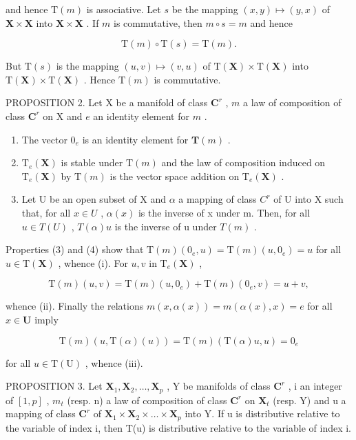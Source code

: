 and hence \(\mathrm{T}(m)\) is associative. Let \(s\) be the mapping \((x,y)\mapsto (y,x)\) of \(\mathbf{X}\times \mathbf{X}\) into \(\mathbf{X}\times \mathbf{X}\) . If \(m\) is commutative, then \(m\circ s = m\) and hence

\[
\mathrm{T} (m) \circ \mathrm{T} (s) = \mathrm{T} (m).
\]

But \(\mathrm{T}(s)\) is the mapping \((u,v)\mapsto (v,u)\) of \(\mathrm{T}(\mathbf{X})\times \mathrm{T}(\mathbf{X})\) into \(\mathrm{T}(\mathbf{X})\times \mathrm{T}(\mathbf{X})\) . Hence \(\mathrm{T}(m)\) is commutative.

PROPOSITION 2. Let X be a manifold of class \(\mathbf{C}^r\) , \(m\) a law of composition of class \(\mathbf{C}^r\) on X and \(e\) an identity element for \(m\) .

\begin{enumerate}
\def\labelenumi{(\roman{enumi})}
\item
  The vector \(0_{e}\) is an identity element for \(\mathbf{T}(m)\) .
\item
  \(\mathrm{T}_{e}(\mathbf{X})\) is stable under \(\mathrm{T}(m)\) and the law of composition induced on \(\mathrm{T}_{e}(\mathbf{X})\) by \(\mathrm{T}(m)\) is the vector space addition on \(\mathrm{T}_{e}(\mathbf{X})\) .
\item
  Let U be an open subset of X and \(\alpha\) a mapping of class \(C^{r}\) of U into X such that, for all \(x \in U\) , \(\alpha(x)\) is the inverse of x under m. Then, for all \(u \in T(U)\) , \(T(\alpha)u\) is the inverse of u under \(T(m)\) .
\end{enumerate}

Properties (3) and (4) show that \(\mathrm{T}(m)(0_e,u) = \mathrm{T}(m)(u,0_e) = u\) for all \(u\in \mathrm{T}(\mathbf{X})\) , whence (i). For \(u,v\) in \(\mathrm{T}_e(\mathbf{X})\) ,

\[
\mathrm{T} (m) (u, v) = \mathrm{T} (m) (u, 0 _ {e}) + \mathrm{T} (m) (0 _ {e}, v) = u + v,
\]

whence (ii). Finally the relations \(m(x, \alpha(x)) = m(\alpha(x), x) = e\) for all \(x \in \mathbf{U}\) imply

\[
\mathrm{T} (m) (u, \mathrm{T} (\alpha) (u)) = \mathrm{T} (m) (\mathrm{T} (\alpha) u, u) = 0 _ {e}
\]

for all \(u \in \mathrm{T}(\mathrm{U})\) , whence (iii).

PROPOSITION 3. Let \(\mathbf{X}_1, \mathbf{X}_2, \ldots, \mathbf{X}_p\) , Y be manifolds of class \(\mathbf{C}^r\) , i an integer of \([1, p]\) , \(m_t\) (resp. n) a law of composition of class \(\mathbf{C}^r\) on \(\mathbf{X}_t\) (resp. Y) and u a mapping of class \(\mathbf{C}^r\) of \(\mathbf{X}_1 \times \mathbf{X}_2 \times \dots \times \mathbf{X}_p\) into Y. If u is distributive relative to the variable of index i, then T(u) is distributive relative to the variable of index i.

